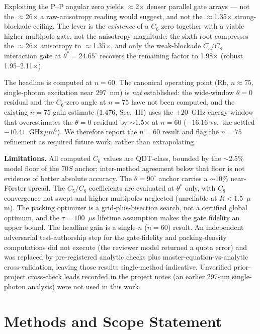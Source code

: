 \documentclass[twocolumn]{article}
\newcommand{\um}{$\mu$m}
\newcommand{\gum}[1]{GHz\,$\mu$m$^{#1}$}%
\begin{document}
Exploiting the P--P angular zero yields $\approx$2$\times$ denser parallel gate arrays --- not the $\approx$26$\times$ a raw-anisotropy reading would suggest, and not the $\approx$1.35$\times$ strong-blockade ceiling. The lever is the \emph{existence} of a $C_6$ zero together with a viable higher-multipole gate, not the anisotropy magnitude: the sixth root compresses the $\approx$26$\times$ anisotropy to $\approx$1.35$\times$, and only the weak-blockade $C_5/C_8$ interaction gate at $\theta^*=24.65^\circ$ recovers the remaining factor to 1.98$\times$ (robust 1.95--2.11$\times$).

The headline is computed at $n=60$. The canonical operating point (Rb, $n\approx75$, single-photon excitation near 297~nm) is \emph{not} established: the wide-window $\theta=0$ residual and the $C_6$-zero angle at $n=75$ have not been computed, and the existing $n=75$ gain estimate (1.476, Sec.~III) uses the $\pm20$~GHz energy window that overestimates the $\theta=0$ residual by $\sim$1.5$\times$ at $n=60$ ($-16.16$ vs.\ the settled $-10.41$~\gum{6}). We therefore report the $n=60$ result and flag the $n=75$ refinement as required future work, rather than extrapolating.

\textbf{Limitations.} All computed $C_6$ values are QDT-class, bounded by the $\sim$2.5\% model floor of the $70S$ anchor; inter-method agreement below that floor is not evidence of better absolute accuracy. The $\theta=90^\circ$ anchor carries a $\sim$10\% near-F\"orster spread. The $C_5/C_8$ coefficients are evaluated at $\theta^*$ only, with $C_8$ convergence not swept and higher multipoles neglected (unreliable at $R<1.5$~\um). The packing optimizer is a grid-plus-bisection search, not a certified global optimum, and the $\tau=100$~$\mu$s lifetime assumption makes the gate fidelity an upper bound. The headline gain is a single-$n$ ($n=60$) result. An independent adversarial test-authorship step for the gate-fidelity and packing-density computations did not execute (the reviewer model returned a quota error) and was replaced by pre-registered analytic checks plus master-equation-vs-analytic cross-validation, leaving those results single-method indicative. Unverified prior-project cross-check leads recorded in the project notes (an earlier 297-nm single-photon analysis) were not used in this work.

\section*{Methods and Scope Statement}
\end{document}
